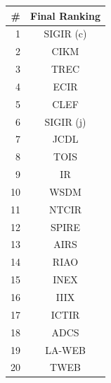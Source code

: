 \begin{tabular}{rc}
\toprule
\#		&	Final Ranking \\ 
\midrule
1		&	SIGIR (c)	\\
2		&	CIKM		\\
3		&	TREC		\\
4		&	ECIR		\\
5		&	CLEF		\\
6		&	SIGIR (j)	\\
7		&	JCDL		\\
8		&	TOIS		\\
9		&	IR			\\
10		&	WSDM		\\
11		&	NTCIR		\\
12		&	SPIRE		\\
13		&	AIRS		\\
14		&	RIAO		\\
15		&	INEX		\\
16		&	IIIX		\\
17		&	ICTIR		\\
18		&	ADCS		\\
19		&	LA-WEB		\\
20		&	TWEB		\\

\bottomrule
\end{tabular}
